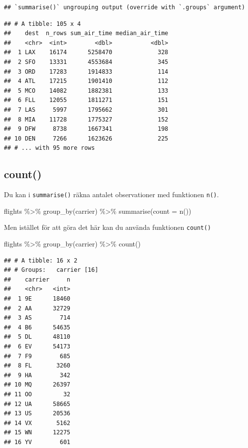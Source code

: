 \documentclass[
]{book}
\newenvironment{Shaded}{\begin{snugshade}}{\end{snugshade}}
\newcommand{\AttributeTok}[1]{\textcolor[rgb]{0.77,0.63,0.00}{#1}}
\newcommand{\FunctionTok}[1]{\textcolor[rgb]{0.00,0.00,0.00}{#1}}
\newcommand{\NormalTok}[1]{#1}
\newcommand{\SpecialCharTok}[1]{\textcolor[rgb]{0.00,0.00,0.00}{#1}}
\begin{document}
\begin{verbatim}
## `summarise()` ungrouping output (override with `.groups` argument)
\end{verbatim}

\begin{verbatim}
## # A tibble: 105 x 4
##    dest  n_rows sum_air_time median_air_time
##    <chr>  <int>        <dbl>           <dbl>
##  1 LAX    16174      5258470             328
##  2 SFO    13331      4553684             345
##  3 ORD    17283      1914833             114
##  4 ATL    17215      1901410             112
##  5 MCO    14082      1882381             133
##  6 FLL    12055      1811271             151
##  7 LAS     5997      1795662             301
##  8 MIA    11728      1775327             152
##  9 DFW     8738      1667341             198
## 10 DEN     7266      1623626             225
## # ... with 95 more rows
\end{verbatim}

\hypertarget{count}{%
\subsection{count()}\label{count}}

Du kan i \texttt{summarise()} räkna antalet observationer med funktionen \texttt{n()}.

\begin{Shaded}
\begin{Highlighting}[]
\NormalTok{flights }\SpecialCharTok{\%\textgreater{}\%}
  \FunctionTok{group\_by}\NormalTok{(carrier) }\SpecialCharTok{\%\textgreater{}\%}
  \FunctionTok{summarise}\NormalTok{(}\AttributeTok{count =} \FunctionTok{n}\NormalTok{())}
\end{Highlighting}
\end{Shaded}

Men istället för att göra det här kan du använda funktionen \texttt{count()}

\begin{Shaded}
\begin{Highlighting}[]
\NormalTok{flights }\SpecialCharTok{\%\textgreater{}\%}
  \FunctionTok{group\_by}\NormalTok{(carrier) }\SpecialCharTok{\%\textgreater{}\%}
  \FunctionTok{count}\NormalTok{()}
\end{Highlighting}
\end{Shaded}

\begin{verbatim}
## # A tibble: 16 x 2
## # Groups:   carrier [16]
##    carrier     n
##    <chr>   <int>
##  1 9E      18460
##  2 AA      32729
##  3 AS        714
##  4 B6      54635
##  5 DL      48110
##  6 EV      54173
##  7 F9        685
##  8 FL       3260
##  9 HA        342
## 10 MQ      26397
## 11 OO         32
## 12 UA      58665
## 13 US      20536
## 14 VX       5162
## 15 WN      12275
## 16 YV        601
\end{verbatim}
\end{document}
